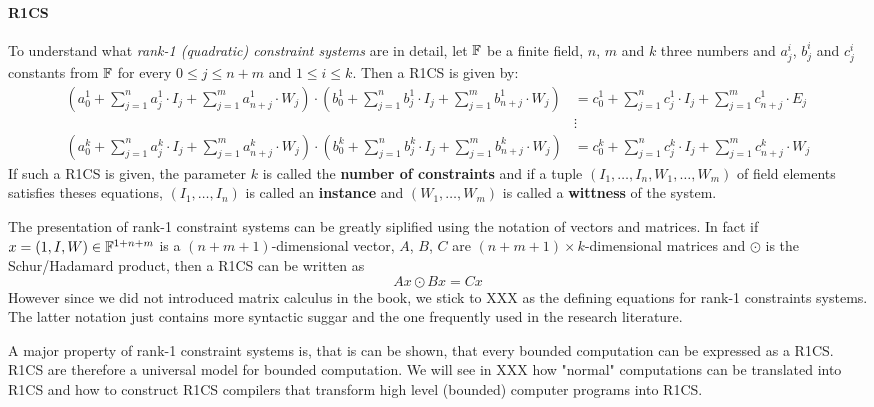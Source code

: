 \paragraph{R1CS} To understand what \textit{rank-1 (quadratic) constraint systems} are in detail, let $\mathbb{F}$ be a finite field, $n$, $m$ and $k$ three numbers and $a_j^i$, $b_j^i$ and $c_j^i$ constants from $\mathbb{F}$ for every $0\leq j \leq n+m$ and $1\leq i \leq k$. Then a R1CS is given by: 
\begin{align*}
\scriptstyle\left(a^1_0 + \sum_{j=1}^n a^1_j \cdot I_j + \sum_{j=1}^m a^1_{n+j} \cdot W_j  \right) \cdot 
\left(b^1_0 + \sum_{j=1}^n b^1_j \cdot I_j + \sum_{j=1}^m b^1_{n+j} \cdot W_j  \right) &= 
\scriptstyle c^1_0 + \sum_{j=1}^n c^1_j \cdot I_j + \sum_{j=1}^m c^1_{n+j} \cdot E_j\\
       & \vdots\\
\scriptstyle\left(a^k_0 + \sum_{j=1}^n a^k_j \cdot I_j + \sum_{j=1}^m a^k_{n+j} \cdot W_j  \right) \cdot 
\left(b^k_0 + \sum_{j=1}^n b^k_j \cdot I_j + \sum_{j=1}^m b^k_{n+j} \cdot W_j  \right) &= 
\scriptstyle c^k_0 + \sum_{j=1}^n c^k_j \cdot I_j + \sum_{j=1}^m c^k_{n+j} \cdot W_j       
\end{align*}
If such a R1CS is given, the parameter $k$ is called the \textbf{number of constraints} and if a tuple $(I_1,\ldots, I_n,W_1,\ldots,W_m)$ of field elements satisfies theses equations, $(I_1,\ldots, I_n)$ is called an \textbf{instance} and $(W_1,\ldots,W_m)$ is called a \textbf{wittness} of the system.

\begin{remark} The presentation of rank-1 constraint systems can be greatly siplified using the notation of vectors and matrices. In fact if
$x= (1,I,W)\in \mathbb{F}^{1+n+m}$ is a $(n+m+1)$-dimensional vector, $A$, $B$, $C$ are $(n+m+1)\times k$-dimensional matrices and $\odot$ is the Schur/Hadamard product, then a R1CS can be written as
$$
Ax \odot Bx = Cx
$$
However since we did not introduced matrix calculus in the book, we stick to XXX as the defining equations for rank-1 constraints systems. The latter notation just contains more syntactic suggar and the one frequently used in the research literature.
\end{remark}
A major property of rank-1 constraint systems is, that is can be shown, that every bounded computation can be expressed as a R1CS. R1CS are therefore a universal model for bounded computation. We will see in XXX how "normal" computations can be translated into R1CS and how to construct R1CS compilers that transform high level (bounded) computer programs into R1CS.

